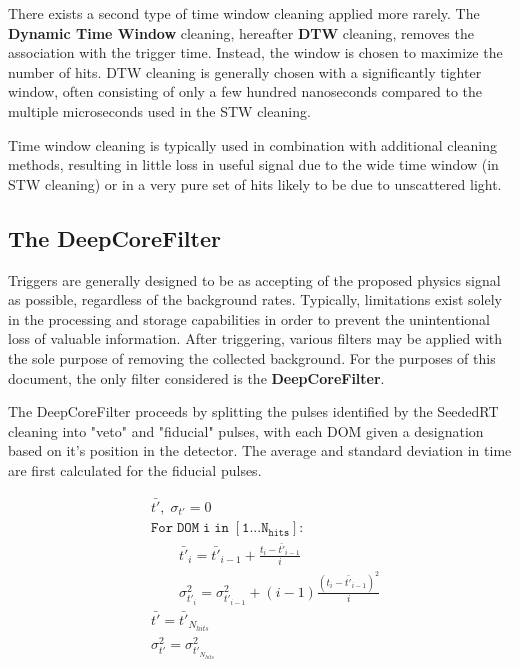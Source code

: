 There exists a second type of time window cleaning applied more rarely.
The \textbf{Dynamic Time Window} cleaning, hereafter \textbf{DTW} cleaning, removes the association with the trigger time. 
Instead, the window is chosen to maximize the number of hits.
DTW cleaning is generally chosen with a significantly tighter window, often consisting of only a few hundred nanoseconds compared to the multiple microseconds used in the STW cleaning.

Time window cleaning is typically used in combination with additional cleaning methods, resulting in little loss in useful signal due to the wide time window (in STW cleaning) or in a very pure set of hits likely to be due to unscattered light.


\subsection{The DeepCoreFilter}
Triggers are generally designed to be as accepting of the proposed physics signal as possible, regardless of the background rates.
Typically, limitations exist solely in the processing and storage capabilities in order to prevent the unintentional loss of valuable information.
After triggering, various filters may be applied with the sole purpose of removing the collected background.
For the purposes of this document, the only filter considered is the \textbf{DeepCoreFilter}.

The DeepCoreFilter proceeds by splitting the pulses identified by the SeededRT cleaning into "veto" and "fiducial" pulses, with each DOM given a designation based on it's position in the detector.
The average and standard deviation in time are first calculated for the fiducial pulses.

\begin{equation}
\begin{split}
	&\bar{t'},\; \sigma_{t'} = 0\\
	&\mathtt{For\; DOM\; i\; in\; [1...N_{hits}]:}\\
	&\qquad	\bar{t'}_i = \bar{t'}_{i-1} + \frac{t_i - \bar{t'}_{i-1}}{i}\\
	&\qquad	\sigma_{t'_i}^2 = \sigma_{t'_{i-1}}^2 + (i-1) \frac{\left(t_i - \bar{t'}_{i-1}\right)^2}{i}\\
	&\bar{t'} = \bar{t'}_{N_{hits}}\\
	&\sigma_{t'}^2 = \sigma_{t'_{N_{hits}}}^2
\end{split}
\end{equation}

